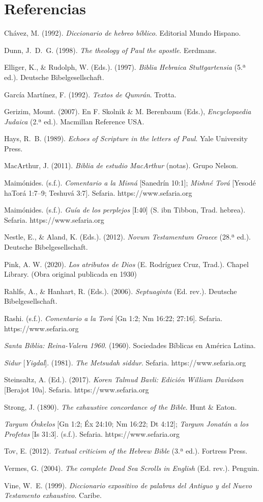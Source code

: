 \documentclass[11pt,letterpaper]{article}
\newcommand{\refapa}[1]{\par{\RaggedRight\hangindent=1.27cm\hangafter=1\noindent #1\par}\vspace{4pt}}
\begin{document}
\section*{Referencias}
\refapa{Chávez, M. (1992). \emph{Diccionario de hebreo bíblico}. Editorial Mundo Hispano.}
\refapa{Dunn, J.~D.~G. (1998). \emph{The theology of Paul the apostle}. Eerdmans.}
\refapa{Elliger, K., \& Rudolph, W. (Eds.). (1997). \emph{Biblia Hebraica Stuttgartensia} (5.ª ed.). Deutsche Bibelgesellschaft.}
\refapa{García Martínez, F. (1992). \emph{Textos de Qumrán}. Trotta.}
\refapa{Gerizim, Mount. (2007). En F. Skolnik \& M. Berenbaum (Eds.), \emph{Encyclopaedia Judaica} (2.ª ed.). Macmillan Reference USA.}
\refapa{Hays, R.~B. (1989). \emph{Echoes of Scripture in the letters of Paul}. Yale University Press.}
\refapa{MacArthur, J. (2011). \emph{Biblia de estudio MacArthur} (notas). Grupo Nelson.}
\refapa{Maimónides. (s.f.). \emph{Comentario a la Misná} [Sanedrín 10:1]; \emph{Mishné Torá} [Yesodé haTorá 1:7--9; Teshuvá 3:7]. Sefaria. https://www.sefaria.org}
\refapa{Maimónides. (s.f.). \emph{Guía de los perplejos} [I:40] (S. ibn Tibbon, Trad. hebrea). Sefaria. https://www.sefaria.org}
\refapa{Nestle, E., \& Aland, K. (Eds.). (2012). \emph{Novum Testamentum Graece} (28.ª ed.). Deutsche Bibelgesellschaft.}
\refapa{Pink, A. W. (2020). \emph{Los atributos de Dios} (E. Rodríguez Cruz, Trad.). Chapel Library. (Obra original publicada en 1930)}
\refapa{Rahlfs, A., \& Hanhart, R. (Eds.). (2006). \emph{Septuaginta} (Ed. rev.). Deutsche Bibelgesellschaft.}
\refapa{Rashi. (s.f.). \emph{Comentario a la Torá} [Gn 1:2; Nm 16:22; 27:16]. Sefaria. https://www.sefaria.org}
\refapa{\emph{Santa Biblia: Reina-Valera 1960}. (1960). Sociedades Bíblicas en América Latina.}
\refapa{\emph{Sidur} [\emph{Yigdal}]. (1981). \emph{The Metsudah siddur}. Sefaria. https://www.sefaria.org}
\refapa{Steinsaltz, A. (Ed.). (2017). \emph{Koren Talmud Bavli: Edición William Davidson} [Berajot 10a]. Sefaria. https://www.sefaria.org}
\refapa{Strong, J. (1890). \emph{The exhaustive concordance of the Bible}. Hunt \& Eaton.}
\refapa{\emph{Targum Ónkelos} [Gn 1:2; Éx 24:10; Nm 16:22; Dt 4:12]; \emph{Targum Jonatán a los Profetas} [Is 31:3]. (s.f.). Sefaria. https://www.sefaria.org}
\refapa{Tov, E. (2012). \emph{Textual criticism of the Hebrew Bible} (3.ª ed.). Fortress Press.}
\refapa{Vermes, G. (2004). \emph{The complete Dead Sea Scrolls in English} (Ed. rev.). Penguin.}
\refapa{Vine, W.~E. (1999). \emph{Diccionario expositivo de palabras del Antiguo y del Nuevo Testamento exhaustivo}. Caribe.}
\end{document}
